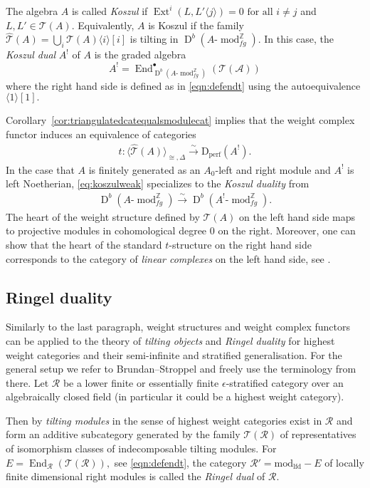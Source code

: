 \documentclass{amsart}
\theoremstyle{plain}
\theoremstyle{TheoremNum}
\theoremstyle{definition}
\theoremstyle{remark}
\numberwithin{equation}{section}
\newcommand{\Z}{\mathbb{Z}}
\newcommand{\Aa}{\mathcal{A}}
\newcommand{\Rr}{\mathcal{R}}
\newcommand{\Tt}{\mathcal{T}}
\newcommand{\Dperf}{\operatorname{D_{perf}}}
\newcommand{\End}{\operatorname{End}}
\newcommand{\Ext}{\operatorname{Ext}}
\newcommand{\DerG}{\operatorname{D}}
\begin{document}
The algebra $A$ is called \emph{Koszul} if $\Ext^i(L,L'\langle j\rangle)=0 \text{ for all } i\neq j$ and $L,L'\in \Tt(A).$ Equivalently, $A$ is Koszul if the family $\widehat{\Tt}(A)=\bigcup_i\Tt(A)\langle i\rangle[i]$ is tilting in $\DerG^b(A\text{-}\operatorname{mod}_{fg}^\Z).$ In this case, the \emph{Koszul dual} $A^!$ of $A$ is the graded algebra
$$A^!=\End^\bullet_{\DerG^b(A\text{-}\operatorname{mod}_{fg}^\Z)}(\Tt(\Aa))$$
where the right hand side is defined as in \eqref{eqn:defendt} using the autoequivalence $\langle 1\rangle[1].$ 

Corollary~\ref{cor:triangulatedcatequalsmodulecat} implies that the weight complex functor induces an equivalence of categories
\begin{align}
    t:\langle \widehat{\Tt}(A) \rangle_{\cong, \Delta}\stackrel{\sim}{\to} \Dperf(A^!).\label{eq:koszulweak}
\end{align}
In the case that $A$ is finitely generated as an $A_0$-left and right module and $A^!$ is left Noetherian, \eqref{eq:koszulweak} specializes to the \emph{Koszul duality} from \cite[Theorem 2.12.5]{beilinson_koszul_1996}
\begin{align}
    \DerG^b(A\text{-}\operatorname{mod}_{fg}^\Z)\stackrel{\sim}{\to} \DerG^b(A^!\text{-}\operatorname{mod}_{fg}^\Z).\label{eq:koszulstrong}
\end{align}
The heart of the weight structure defined by $\Tt(A)$ on the left hand side maps to projective modules in cohomological degree $0$ on the right. Moreover, one can show that the heart of the standard $t$-structure on the right hand side corresponds to the category of \emph{linear complexes} on the left hand side, see \cite{mazorchuk_quadratic_2009}.
\subsection{Ringel duality}
Similarly to the last paragraph, weight structures and weight complex functors can be applied to the theory of \emph{tilting objects} and \emph{Ringel duality} for highest
weight categories and their semi-infinite and stratified generalisation. For the general setup we refer to Brundan--Stroppel \cite{brundan_semi-infinite_2021} and freely use the terminology from there. 
Let $\Rr$ be a lower finite or essentially finite $\epsilon$-stratified category over an algebraically closed field (in particular it could be a highest weight category).

Then by \cite[Theorems 4.2, 4.13, 4.18]{brundan_semi-infinite_2021} \emph{tilting modules} in the sense of highest weight categories exist in $\Rr$ and form an additive subcategory generated by the family $\Tt(\Rr)$ of representatives of isomorphism classes of indecomposable tilting modules. 
For $E=\End_\Rr(\Tt(\Rr)),$ see \eqref{eqn:defendt}, the category $\Rr'=\operatorname{mod_{lfd}-}E$ of locally finite dimensional right modules is called the \emph{Ringel dual} of $\Rr.$ 
\end{document}
